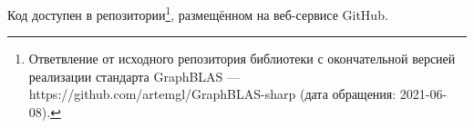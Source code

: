 \documentclass[14pt]{matmex-diploma-custom}
\begin{document}
Код доступен в репозитории\footnote{Ответвление от исходного репозитория библиотеки с окончательной версией реализации стандарта GraphBLAS --- https://github.com/artemgl/GraphBLAS-sharp (дата обращения: 2021-06-08).}, размещённом на веб-сервисе GitHub.



\end{document}

